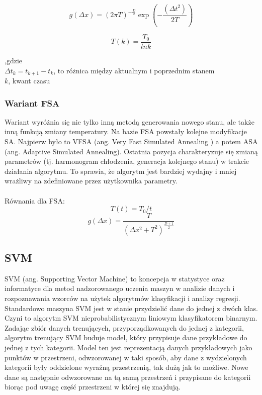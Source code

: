 \documentclass{article}
\begin{document}
\[
g(\Delta x) = (2\pi T)^{-\frac{D}{2}}\exp(-\frac{({\Delta t}^2)}{2T})
\]

\[
T(k) = \frac{T_0}{lnk}
\]

,gdzie \\
    $ \Delta t_k = t_{k+1} - t_k $, to różnica między aktualnym i poprzednim stanem  \\
    $ k $, kwant czasu

\subsubsection{Wariant FSA}
Wariant wyróżnia się nie tylko inną metodą generowania nowego stanu, ale także inną funkcją zmiany temperatury. Na bazie FSA powstały kolejne modyfikacje SA. Najpierw było to VFSA (ang. Very Fast Simulated Annealing ) a potem ASA (ang. Adaptive Simulated Annealing). Ostatnia pozycja charakteryzuje się zmianą parametrów  (tj. harmonogram chłodzenia, generacja kolejnego stanu) w trakcie działania algorytmu. To sprawia, że algorytm jest bardziej wydajny i mniej wrażliwy na zdefiniowane przez użytkownika parametry.
\\ \\
Równania dla FSA: 
\[  T(t) = T_0/t  \]
\[  g(\Delta x ) = \frac{T}{(\Delta x^2 + T^2)^{\frac{D+1}{2}}}  \]

\subsection{SVM}
SVM (ang. Supporting Vector Machine) to koncepcja w statystyce oraz informatyce dla metod nadzorowanego uczenia maszyn w analizie danych i rozpoznawania wzorców na użytek algorytmów klasyfikacji i analizy regresji. Standardowo maszyna SVM jest w stanie przydzielić dane do jednej z dwóch klas. Czyni to algorytm SVM nieprobabilistycznym liniowym klasyfikatorem binarnym. Zadając zbiór danych trenujących, przyporządkowanych do jednej z kategorii, algorytm trenujący SVM buduje model, który przypisuje dane przykładowe do jednej z tych kategorii. Model ten jest reprezentacją danych przykładowych jako punktów w przestrzeni, odwzorowanej w taki sposób, aby dane z wydzielonych kategorii były oddzielone wyraźną przestrzenią, tak dużą jak to możliwe. Nowe dane są następnie odwzorowane na tą samą przestrzeń i przypisane do kategorii biorąc pod uwagę część przestrzeni w której się znajdują.
\end{document}
